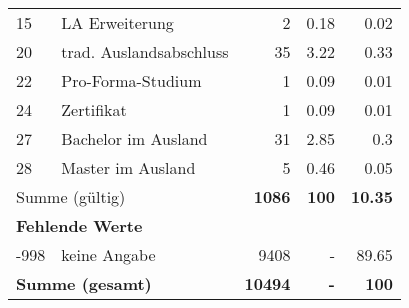\begin{longtable}{lXrrr}
     15 &
     \multicolumn{1}{X}{ LA Erweiterung   } &


       \num{2} &
       \num[round-mode=places,round-precision=2]{0,18} &
         \num[round-mode=places,round-precision=2]{0,02} \\

     20 &
     \multicolumn{1}{X}{ trad. Auslandsabschluss   } &


       \num{35} &
       \num[round-mode=places,round-precision=2]{3,22} &
         \num[round-mode=places,round-precision=2]{0,33} \\

     22 &
     \multicolumn{1}{X}{ Pro-Forma-Studium   } &


       \num{1} &
       \num[round-mode=places,round-precision=2]{0,09} &
         \num[round-mode=places,round-precision=2]{0,01} \\

     24 &
     \multicolumn{1}{X}{ Zertifikat   } &


       \num{1} &
       \num[round-mode=places,round-precision=2]{0,09} &
         \num[round-mode=places,round-precision=2]{0,01} \\

     27 &
     \multicolumn{1}{X}{ Bachelor im Ausland   } &


       \num{31} &
       \num[round-mode=places,round-precision=2]{2,85} &
         \num[round-mode=places,round-precision=2]{0,3} \\

     28 &
     \multicolumn{1}{X}{ Master im Ausland   } &


       \num{5} &
       \num[round-mode=places,round-precision=2]{0,46} &
         \num[round-mode=places,round-precision=2]{0,05} \\
     \midrule
     \multicolumn{2}{l}{Summe (gültig)} &
       \textbf{\num{1086}} &
     \textbf{100} &
       \textbf{\num[round-mode=places,round-precision=2]{10,35}} \\
     \multicolumn{5}{l}{\textbf{Fehlende Werte}}\\
       -998 &
       keine Angabe &
         \num{9408} &
        - &
         \num[round-mode=places,round-precision=2]{89,65} \\
     \midrule
     \multicolumn{2}{l}{\textbf{Summe (gesamt)}} &
          \textbf{\num{10494}} &
        \textbf{-} &
        \textbf{100} \\
     \bottomrule
     \end{longtable}
     
